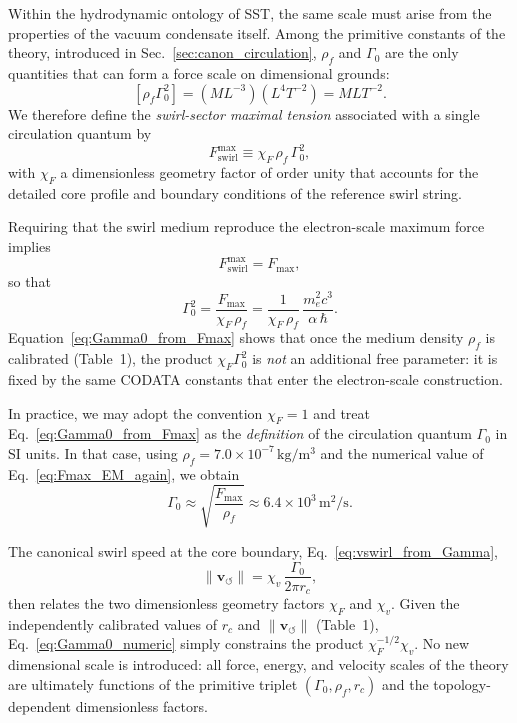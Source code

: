\documentclass[11pt]{article}
\begin{document}
Within the hydrodynamic ontology of SST, the same scale must arise from the properties of the vacuum condensate itself. Among the primitive constants of the theory, introduced in Sec.~\ref{sec:canon_circulation}, \(\rho_{\!f}\) and \(\Gamma_0\) are the only quantities that can form a force scale on dimensional grounds:
        \[
    [\rho_{\!f}\Gamma_0^2] = (M L^{-3})(L^4 T^{-2}) = M L T^{-2}.
        \]
We therefore define the \emph{swirl-sector maximal tension} associated with a single circulation quantum by
        \begin{equation}
    F_{\text{swirl}}^{\max} \equiv \chi_F\,\rho_{\!f}\,\Gamma_0^{2},
            \label{eq:Fmax_circ_def}
        \end{equation}
with \(\chi_F\) a dimensionless geometry factor of order unity that accounts for the detailed core profile and boundary conditions of the reference swirl string.

Requiring that the swirl medium reproduce the electron-scale maximum force implies
        \begin{equation}
    F_{\text{swirl}}^{\max} = F_{\max},
        \end{equation}
        so that
        \begin{equation}
    \Gamma_0^{2} = \frac{F_{\max}}{\chi_F\,\rho_{\!f}} = \frac{1}{\chi_F\,\rho_{\!f}}\,\frac{m_e^2 c^3}{\alpha\,\hbar}.
            \label{eq:Gamma0_from_Fmax}
        \end{equation}
Equation~\eqref{eq:Gamma0_from_Fmax} shows that once the medium density \(\rho_{\!f}\) is calibrated (Table~1), the product \(\chi_F \Gamma_0^2\) is \emph{not} an additional free parameter: it is fixed by the same CODATA constants that enter the electron-scale construction.

In practice, we may adopt the convention \(\chi_F = 1\) and treat Eq.~\eqref{eq:Gamma0_from_Fmax} as the \emph{definition} of the circulation quantum \(\Gamma_0\) in SI units. In that case, using \(\rho_{\!f} = 7.0\times 10^{-7}\,\mathrm{kg/m^3}\) and the numerical value of Eq.~\eqref{eq:Fmax_EM_again}, we obtain
        \begin{equation}
    \Gamma_0 \approx \sqrt{\frac{F_{\max}}{\rho_{\!f}}} \approx 6.4\times 10^{3}\,\mathrm{m^2/s}.
            \label{eq:Gamma0_numeric}
        \end{equation}

The canonical swirl speed at the core boundary, Eq.~\eqref{eq:vswirl_from_Gamma},
        \begin{equation}
    \lVert \mathbf{v}_{\!\boldsymbol{\circlearrowleft}}\rVert = \chi_v\,\frac{\Gamma_0}{2\pi r_c},
        \end{equation}
then relates the two dimensionless geometry factors \(\chi_F\) and \(\chi_v\). Given the independently calibrated values of \(r_c\) and \(\lVert \mathbf{v}_{\!\boldsymbol{\circlearrowleft}}\rVert\) (Table~1), Eq.~\eqref{eq:Gamma0_numeric} simply constrains the product \(\chi_F^{-1/2}\chi_v\). No new dimensional scale is introduced: all force, energy, and velocity scales of the theory are ultimately functions of the primitive triplet \((\Gamma_0,\rho_{\!f},r_c)\) and the topology-dependent dimensionless factors.
\end{document}
